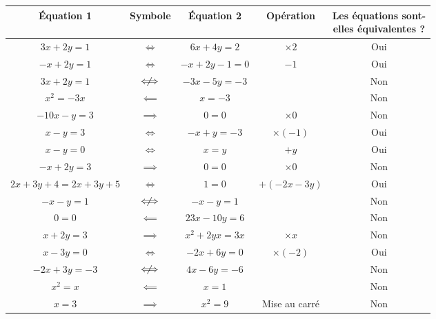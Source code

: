 {	
	\begin{center}
	\begin{tabular}{ccc|c|c}
		Équation 1 & Symbole & Équation 2 & Opération & \thead{Les équations sont-\\ elles équivalentes ?} \\ \hline
		$3x + 2y = 1$ & {$\iff$} & $6x  + 4y = 2$ & {$\times2$} & {Oui} \\ \hline
		$-x + 2y = 1$ & {$\iff$} & $-x + 2y - 1 = 0$ & {$-1$} & {Oui} \\ \hline
		$3x + 2y = 1$ & {$\centernot\iff$} & $-3x - 5y = -3$ & & {Non} \\ \hline
		$x^2 = -3x$ & {$\impliedby$} & $x = -3$ & & {Non} \\ \hline
		$-10x - y = 3$ & {$\implies$} & $0=0$ & {$\times0$} & {Non} \\ \hline
		$x-y= 3$ & {$\iff$} & $-x + y = -3$ & {$\times(-1)$} & {Oui} \\ \hline
		$x -y = 0$ &{$\iff$} & $x=y$ & {$+y$} & {Oui} \\ \hline
		$-x + 2y = 3$ & {$\implies$} & $0=0$ & {$\times0$} & {Non} \\ \hline
		$2x + 3y + 4 = 2x + 3y + 5$ & {$\iff$} & $1=0$ & {$+(-2x-3y)$} & {Oui} \\ \hline
		$-x - y = 1$ & {$\centernot\iff$} & $-x - y = 1$ & & {Non} \\ \hline
		$0=0$ & {$\impliedby$} & $23x - 10y = 6$ & & {Non} \\ \hline
		$x + 2y = 3$ & {$\implies$} & $x^2 + 2yx = 3x$ & {$\times x$} & {Non} \\ \hline
		$x-3y  =0$ & {$\iff$} & $-2x+6y = 0$ & {$\times(-2)$} & {Oui} \\ \hline
		$-2x + 3y = -3$ & {$\centernot\iff$} & $4x - 6y = -6$ & & {Non} \\ \hline
		$x^2 = x$ & {$\impliedby$} & $x = 1$ & & {Non} \\ \hline
		$x = 3$ & {$\implies$} & $x^2 = 9$ & {Mise au carré} & {Non} \\ \hline
	\end{tabular}
	\end{center}
	
}

\newpage

